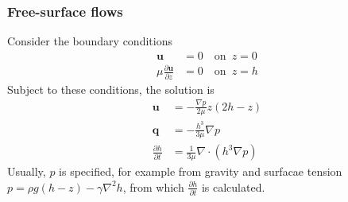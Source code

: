 \documentclass{jknotes}
\begin{document}
\subsubsection{Free-surface flows}
Consider the boundary conditions
\begin{align}
	\symbf{u} &= 0 \hspace{1em} \text{on} \,\,\, z=0 \\
	\mu \frac{\partial \symbf{u}}{\partial z} &= 0 \hspace{1em} \text{on}
	\,\,\, z=h
\end{align}
Subject to these conditions, the solution is
\begin{align}
	\symbf{u} &= - \frac{\nabla p}{2\mu} z(2h-z) \\
	\symbf{q} &= -\frac{h^3}{3\mu} \nabla p	 \\
	\frac{\partial h}{\partial t} &= \frac{1}{3\mu} \nabla \cdot (h^3 \nabla
	p)
\end{align}
Usually, $p$ is specified, for example from gravity and surfacae tension $p =
\rho g (h-z) - \gamma \nabla^2 h$, from which $\frac{\partial h}{\partial t}$
is calculated.
\end{document}
